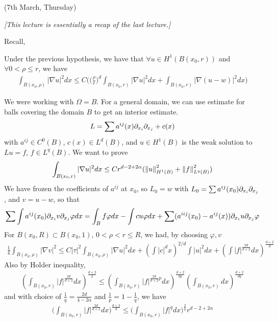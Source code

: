 \documentclass[12pt,a4paper]{article}
\begin{document}
(7th March, Thursday)
\s

\emph{[This lecture is essentially a recap of the last lecture.]}
\s

Recall,

\corr Under the previous hypothesis, we have that $\forall u\in H^1(B(x_0, r))$ and $\forall  0< \rho \leq r$, we have
\begin{align*}
\int_{B(x_0, \rho)} |\nabla u|^2 dx \leq C \Big( \big( \frac{\rho}{r}\big)^d \int_{B(x_0, r)} |\nabla u|^2 dx + \int_{B(x_0, r)} |\nabla(u-w)|^2 dx \Big)
\end{align*}
\eos
\s

We were working with $\Omega = B$. For a general domain, we can use estimate for balls covering the domain $B$ to get an interior estimate.
\begin{align*}
L =\sum a^{ij}(x) \partial_{x_i} \partial_{x_j} + c(x)
\end{align*}
with $a^{ij} \in C^0(B)$, $c(x) \in L^d(B)$, and $u\in H^1(B)$ is the weak solution to $Lu =f$, $f\in L^q(B)$. We want to prove
\begin{align*}
\int_{B(x_0,r)} |\nabla u|^2 dx \leq Cr^{d-2+2\alpha} (\snorms{u}{H^1(B)}^2 + \snorms{f}{L^q(B)}^2)
\end{align*}
We have frozen the coefficients of $a^{ij}$ at $x_0$, so $L_0 = w$ with $L_0 = \sum a^{ij}(x_0) \partial_{x_i} \partial_{x_j}$, and $v =u-w$, so that
\begin{align*}
\sum \int a^{ij}(x_0) \partial_{x_i} v \partial_{x_j} \varphi dx = \int_B f\varphi dx - \int cu \varphi dx + \sum (a^{iij}(x_0) - a^{ij}(x)) \partial_{x_i} u \partial_{x_j} \varphi 
\end{align*}
\quad For $B(x_0, R) \subset B(x_0, 1)$, $0< \rho < r \leq R$, we had, by choosing $\varphi,v$
\begin{align*}
\frac{1}{4} \int_{B(x_0, \rho)} |\nabla v|^2 \leq C |\tau|^2 \int_{B(x_0, \rho)} |\nabla u|^2 dx + (\int |c|^d x)^{2/d} \int |u|^2 dx + (\int |f|^{\frac{2d}{d+2}}dx)^{\frac{d+2}{d}}
\end{align*}
Also by Holder inequality,
\begin{align*}
(\int_{B(x_0, r)} |f|^{\frac{2d}{d+2}}dx)^{\frac{d+2}{2}} \leq (\int_{B(x_0, r)}|f|^{\frac{2d}{d+2}p}dx)^{\frac{d+2}{dp}} (\int_{B(x_0, r)} dx)^{\frac{d+2}{dq}}
\end{align*}
and with choice of $\frac{1}{q} = \frac{2d}{4- 2\alpha}$ and $\frac{1}{p}= 1-\frac{1}{q}$, we have
\begin{align*}
\Big( \int_{B(x_0, r)} |f|^{\frac{2d}{d+2}} dx\Big)^{\frac{d+2}{d}} \leq \Big( \int_{B(x_0, r)} |f|^{q}dx \Big)^{\frac{2}{q}} r^{d-2 + 2\alpha}
\end{align*}
\end{document}
